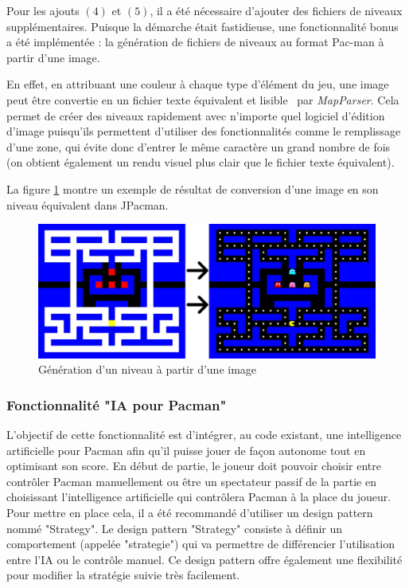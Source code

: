 \documentclass[12pt, openany]{report}
\begin{document}
Pour les ajouts $(4)$ et $(5)$, il a été nécessaire d'ajouter des fichiers de niveaux supplémentaires. Puisque la démarche était fastidieuse, une fonctionnalité \og bonus \fg \, a été implémentée : la génération de fichiers de niveaux au format Pac-man à partir d'une image. \label{map_generator_txt}

En effet, en attribuant une couleur à chaque type d'élément du jeu,  une image peut être convertie en un fichier texte équivalent et \og lisible \fg \, par \mbox{\textit{MapParser}}. Cela permet de créer des niveaux rapidement avec n'importe quel logiciel d'édition d'image puisqu'ils permettent d'utiliser des fonctionnalités comme le \og remplissage \fg d'une zone, qui évite donc d'entrer le même caractère un grand nombre de fois (on obtient également un rendu visuel plus clair que le fichier texte équivalent). 

La figure \ref{map_generator_img} montre un exemple de résultat de conversion d'une image en son niveau équivalent dans JPacman.
\begin{figure}[h]
	\centering
	\includegraphics[width=13cm]{Images/mapgenerator.jpg}
	\caption{\label{map_generator_img} Génération d'un niveau à partir d'une image}
\end{figure}

\subsubsection{Fonctionnalité "IA pour Pacman"}

L'objectif de cette fonctionnalité est d'intégrer, au code existant, une intelligence artificielle pour Pacman afin qu'il puisse jouer de façon autonome tout en optimisant son score. En début de partie, le joueur doit pouvoir choisir entre contrôler Pacman manuellement ou être un spectateur passif de la partie en choisissant l'intelligence artificielle qui contrôlera Pacman à la place du joueur. Pour mettre en place cela, il a été recommandé d'utiliser un design pattern nommé "Strategy". Le design pattern "Strategy" consiste à définir un comportement (appelée "strategie") qui va permettre de différencier l'utilisation entre l'IA ou le contrôle manuel. Ce design pattern offre également une flexibilité pour modifier la stratégie suivie très facilement.
\end{document}

